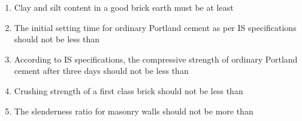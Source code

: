 \documentclass[11pt,a4paper]{article}
\begin{document}
\begin{enumerate}
\begin{enumerate}[label=\Alph*.]
\end{enumerate}
\item{Clay and silt content in a good brick earth must be at least}
\\
\item{The initial setting time for ordinary Portland cement as per IS specifications should not be less than}
\\
\item{According to IS specifications, the compressive strength of ordinary Portland cement after three days should not be less than}
\\
\item{Crushing strength of a first class brick should not be less than}
\\
\item{The slenderness ratio for masonry walls should not be more than}
\\
\end{enumerate}
\end{document}
